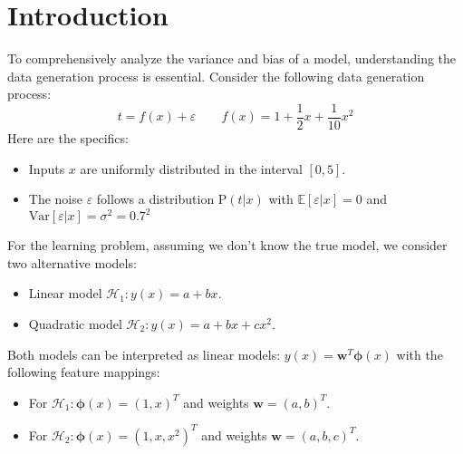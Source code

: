 \section{Introduction}

To comprehensively analyze the variance and bias of a model, understanding the data generation process is essential. 
Consider the following data generation process:
\[t=f(x)+\varepsilon \qquad f(x)=1+\dfrac{1}{2}x+\dfrac{1}{10}x^2\]
Here are the specifics:
\begin{itemize}
    \item Inputs $x$ are uniformly distributed in the interval $[0, 5]$.
    \item The noise $\varepsilon$ follows a distribution $\text{P}(t|x)$ with $\mathbb{E}[\varepsilon|x] = 0$ and $\text{Var}[\varepsilon|x] = \sigma^2 = 0.7^2$
\end{itemize}

For the learning problem, assuming we don't know the true model, we consider two alternative models:
\begin{itemize}
    \item Linear model $\mathcal{H}_1:y(x)=a+bx$.
    \item Quadratic model $\mathcal{H}_2:y(x)=a+bx+cx^2$.
\end{itemize}
Both models can be interpreted as linear models: $y(x) = \textbf{w}^T\boldsymbol{\phi}(x)$ with the following feature mappings:
\begin{itemize}
    \item For $\mathcal{H}_1:\boldsymbol{\phi}(x)={\left(1,x\right)}^T$ and weights $\textbf{w}={(a,b)}^T$.
    \item For $\mathcal{H}_2:\boldsymbol{\phi}(x)={\left(1,x,x^2\right)}^T$ and weights $\textbf{w}={(a,b,c)}^T$.
\end{itemize}